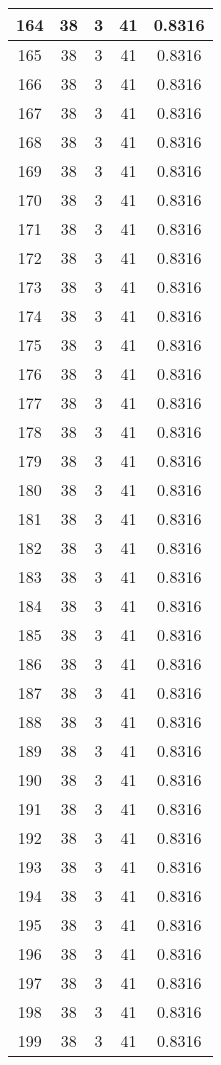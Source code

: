 \documentclass[letterpaper, 12pt]{article}
\begin{document}
\begin{longtable}{|c|c|c|c|c|}
\hline
164 & 38 & 3 & 41 & 0.8316 \\
\hline
165 & 38 & 3 & 41 & 0.8316 \\
\hline
166 & 38 & 3 & 41 & 0.8316 \\
\hline
167 & 38 & 3 & 41 & 0.8316 \\
\hline
168 & 38 & 3 & 41 & 0.8316 \\
\hline
169 & 38 & 3 & 41 & 0.8316 \\
\hline
170 & 38 & 3 & 41 & 0.8316 \\
\hline
171 & 38 & 3 & 41 & 0.8316 \\
\hline
172 & 38 & 3 & 41 & 0.8316 \\
\hline
173 & 38 & 3 & 41 & 0.8316 \\
\hline
174 & 38 & 3 & 41 & 0.8316 \\
\hline
175 & 38 & 3 & 41 & 0.8316 \\
\hline
176 & 38 & 3 & 41 & 0.8316 \\
\hline
177 & 38 & 3 & 41 & 0.8316 \\
\hline
178 & 38 & 3 & 41 & 0.8316 \\
\hline
179 & 38 & 3 & 41 & 0.8316 \\
\hline
180 & 38 & 3 & 41 & 0.8316 \\
\hline
181 & 38 & 3 & 41 & 0.8316 \\
\hline
182 & 38 & 3 & 41 & 0.8316 \\
\hline
183 & 38 & 3 & 41 & 0.8316 \\
\hline
184 & 38 & 3 & 41 & 0.8316 \\
\hline
185 & 38 & 3 & 41 & 0.8316 \\
\hline
186 & 38 & 3 & 41 & 0.8316 \\
\hline
187 & 38 & 3 & 41 & 0.8316 \\
\hline
188 & 38 & 3 & 41 & 0.8316 \\
\hline
189 & 38 & 3 & 41 & 0.8316 \\
\hline
190 & 38 & 3 & 41 & 0.8316 \\
\hline
191 & 38 & 3 & 41 & 0.8316 \\
\hline
192 & 38 & 3 & 41 & 0.8316 \\
\hline
193 & 38 & 3 & 41 & 0.8316 \\
\hline
194 & 38 & 3 & 41 & 0.8316 \\
\hline
195 & 38 & 3 & 41 & 0.8316 \\
\hline
196 & 38 & 3 & 41 & 0.8316 \\
\hline
197 & 38 & 3 & 41 & 0.8316 \\
\hline
198 & 38 & 3 & 41 & 0.8316 \\
\hline
199 & 38 & 3 & 41 & 0.8316 \\
\hline
\end{longtable}
\end{document}
